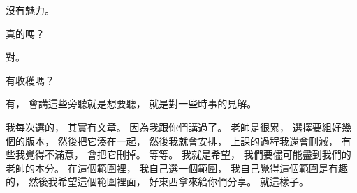 \hypertarget{w01:cue:3410}{}沒有魅力。

\hypertarget{w01:cue:3411}{}真的嗎？

\hypertarget{w01:cue:3412}{}對。

\hypertarget{w01:cue:3413}{}有收穫嗎？

\hypertarget{w01:cue:3414}{}有，
\hypertarget{w01:cue:3415}{}會講這些旁聽就是想要聽，
\hypertarget{w01:cue:3416}{}就是對一些時事的見解。

\hypertarget{w01:cue:3417}{}我每次選的，
\hypertarget{w01:cue:3418}{}其實有文章。
\hypertarget{w01:cue:3419}{}因為我跟你們講過了。
\hypertarget{w01:cue:3420}{}老師是很累，
\hypertarget{w01:cue:3421}{}選擇要組好幾個的版本，
\hypertarget{w01:cue:3422}{}然後把它湊在一起，
\hypertarget{w01:cue:3423}{}然後我就會安排，
\hypertarget{w01:cue:3424}{}上課的過程我還會刪減，
\hypertarget{w01:cue:3425}{}有些我覺得不滿意，
\hypertarget{w01:cue:3426}{}會把它刪掉。
\hypertarget{w01:cue:3427}{}等等。
\hypertarget{w01:cue:3428}{}我就是希望，
\hypertarget{w01:cue:3429}{}我們要儘可能盡到我們的老師的本分。
\hypertarget{w01:cue:3430}{}在這個範圍裡，
\hypertarget{w01:cue:3431}{}我自己選一個範圍，
\hypertarget{w01:cue:3432}{}我自己覺得這個範圍是有趣的，
\hypertarget{w01:cue:3433}{}然後我希望這個範圍裡面，
\hypertarget{w01:cue:3434}{}好東西拿來給你們分享。
\hypertarget{w01:cue:3435}{}就這樣子。

